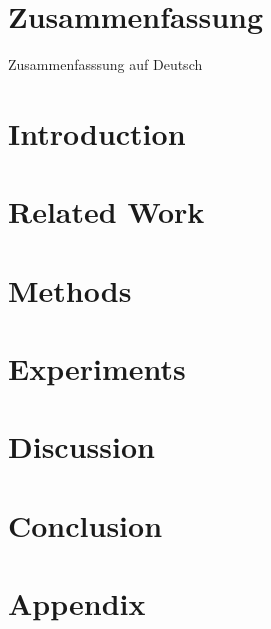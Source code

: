 \clearpage
\chapter*{Zusammenfassung}\label{c.zusammenfassung}
\foreignlanguage{ngerman}{
Zusammenfasssung auf Deutsch
}

\clearpage
\tableofcontents
\clearpage
\listoffigures
\clearpage
\listoftables

\clearpage
{} %
\chapter{Introduction}\label{c.introduction}


\clearpage
\chapter{Related Work}\label{c.related}


\clearpage
\chapter{Methods}\label{c.methods}


\clearpage
\chapter{Experiments}\label{c.experiments}


\clearpage
\chapter{Discussion}\label{c.discussion}


\clearpage 
\chapter{Conclusion}\label{c.conclusion}


\clearpage
\appendix
\chapter{Appendix}


\clearpage
%



